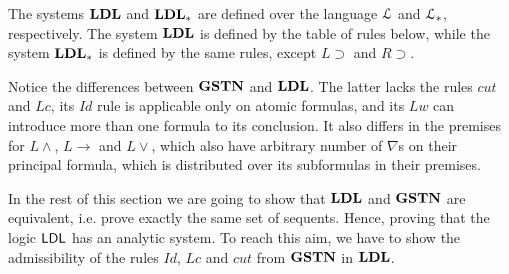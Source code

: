 The systems $\mathbf{LDL}$ and $\mathbf{LDL}_*$ are defined over the language $\mathcal{L}$ and $\mathcal{L}_*$, respectively. The system $\mathbf{LDL}$ is defined by the table of rules below, while the system $\mathbf{LDL}_*$ is defined by the same rules, except $L \supset$ and $R \supset$.


Notice the differences between $\mathbf{GSTN}$ and $\mathbf{LDL}$. The latter lacks the rules $cut$ and $Lc$, its $Id$ rule is applicable only on atomic formulas, and its $Lw$ can introduce more than one formula to its conclusion. It also differs in the premises for $L \wedge$, $L \rightarrow$ and $L \vee$, which also have arbitrary number of $\nabla$s on their principal formula, which is distributed over its subformulas in their premises.

In the rest of this section we are going to show that $\mathbf{LDL}$ and $\mathbf{GSTN}$ are equivalent, i.e. prove exactly the same set of sequents. Hence, proving that the logic $\mathsf{LDL}$ has an analytic system. To reach this aim, we have to show the admissibility of the rules $Id$, $Lc$ and $cut$ from $\mathbf{GSTN}$ in $\mathbf{LDL}$.

